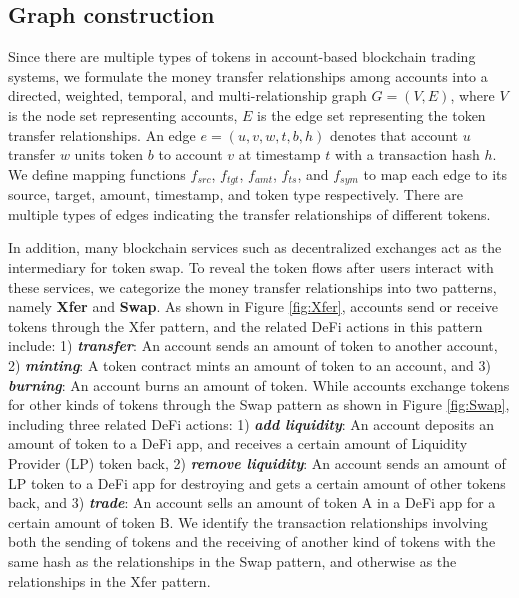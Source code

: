 \subsection{Graph construction}
Since there are multiple types of tokens in account-based blockchain trading systems, we formulate the money transfer relationships among accounts into a directed, weighted, temporal, and multi-relationship graph $G=(V, E)$, where $V$ is the node set representing accounts, $E$ is the edge set representing the token transfer relationships.
An edge $e=(u,v,w,t,b,h)$ denotes that account $u$ transfer $w$ units token $b$ to account $v$ at timestamp $t$ with a transaction hash $h$. We define mapping functions $f_{src}$, $f_{tgt}$, $f_{amt}$, $f_{ts}$, and $f_{sym}$ to map each edge to its source, target, amount, timestamp, and token type respectively. There are multiple types of edges indicating the transfer relationships of different tokens.

In addition, many blockchain services such as decentralized exchanges act as the intermediary for token swap. 
To reveal the token flows after users interact with these services, we categorize the money transfer relationships into two patterns, namely \textbf{Xfer} and \textbf{Swap}.
As shown in Figure \ref{fig:Xfer}, accounts send or receive tokens through the Xfer pattern, and the related DeFi actions \cite{wu2021defiranger} in this pattern include: 1) \textbf{\textit{transfer}}: An account sends an amount of token to another account, 2) \textbf{\textit{minting}}: A token contract mints an amount of token to an account, and 3) \textbf{\textit{burning}}: An account burns an amount of token.
While accounts exchange tokens for other kinds of tokens through the Swap pattern as shown in Figure \ref{fig:Swap}, including three related DeFi actions: 1) \textbf{\textit{add liquidity}}: An account deposits an amount of token to a DeFi app, and receives a certain amount of Liquidity Provider (LP) token back, 2) \textbf{\textit{remove liquidity}}: An account sends an amount of LP token to a DeFi app for destroying and gets a certain amount of other tokens back, and 3) \textbf{\textit{trade}}: An account sells an amount of token A in a DeFi app for a certain amount of token B. We identify the transaction relationships involving both the sending of tokens and the receiving of another kind of tokens with the same hash as the relationships in the Swap pattern, and otherwise as the relationships in the Xfer pattern. 

